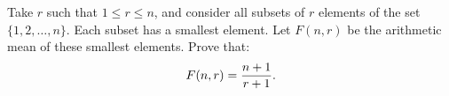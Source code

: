 Take $r$ such that $1\le r\le n$,  and consider all subsets of $r$ elements of the set $\{1,2,\ldots,n\}$. Each subset has a smallest element. Let $F(n,r)$ be the arithmetic mean of these smallest elements. Prove that: \[ F(n,r)={n+1\over r+1}. \]